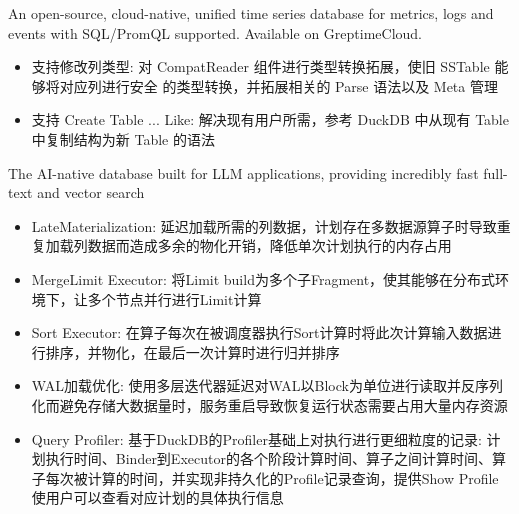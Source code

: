 \documentclass{resume}
\begin{document}
\begin{onehalfspacing}
  An open-source, cloud-native, unified time series database for metrics, logs and events with SQL/PromQL
supported. Available on GreptimeCloud.
\begin{itemize}
  \item 支持修改列类型: 对 CompatReader 组件进行类型转换拓展，使旧 SSTable 能够将对应列进行安全
的类型转换，并拓展相关的 Parse 语法以及 Meta 管理
  \item 支持 Create Table ... Like: 解决现有用户所需，参考 DuckDB 中从现有 Table 中复制结构为新 Table 的语法
\end{itemize}
\end{onehalfspacing}

\begin{onehalfspacing}
  The AI-native database built for LLM applications, providing incredibly fast full-text and vector search
\begin{itemize}
  \item LateMaterialization: 延迟加载所需的列数据，计划存在多数据源算子时导致重复加载列数据而造成多余的物化开销，降低单次计划执行的内存占用
  \item MergeLimit Executor: 将Limit build为多个子Fragment，使其能够在分布式环境下，让多个节点并行进行Limit计算
  \item Sort Executor: 在算子每次在被调度器执行Sort计算时将此次计算输入数据进行排序，并物化，在最后一次计算时进行归并排序
  \item WAL加载优化: 使用多层迭代器延迟对WAL以Block为单位进行读取并反序列化而避免存储大数据量时，服务重启导致恢复运行状态需要占用大量内存资源
  \item Query Profiler: 基于DuckDB的Profiler基础上对执行进行更细粒度的记录: 计划执行时间、Binder到Executor的各个阶段计算时间、算子之间计算时间、算子每次被计算的时间，并实现非持久化的Profile记录查询，提供Show Profile使用户可以查看对应计划的具体执行信息
\end{itemize}
\end{onehalfspacing}
\end{document}
